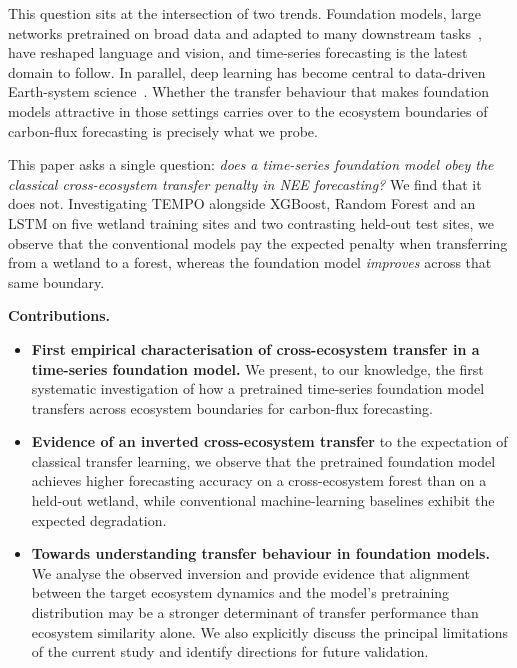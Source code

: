 \documentclass[sigconf]{acmart}          %
\begin{document}
This question sits at the intersection of two trends. Foundation models, large
networks pretrained on broad data and adapted to many downstream
tasks~\cite{bommasani2021foundation}, have reshaped language and vision, and
time-series forecasting is the latest domain to follow. In parallel, deep
learning has become central to data-driven Earth-system
science~\cite{reichstein2019deep}. Whether the transfer behaviour that makes
foundation models attractive in those settings carries over to the ecosystem
boundaries of carbon-flux forecasting is precisely what we probe.

This paper asks a single question: \emph{does a time-series foundation model
obey the classical cross-ecosystem transfer penalty in NEE forecasting?}
We find that it does not. Investigating TEMPO alongside XGBoost, Random Forest
and an LSTM on five wetland training sites and two contrasting held-out test
sites, we observe that the conventional models pay the expected penalty
when transferring from a wetland to a forest, whereas the foundation model
\emph{improves} across that same boundary.

\noindent\textbf{Contributions.}
\begin{itemize}
    \item \textbf{First empirical characterisation of cross-ecosystem transfer in a time-series foundation model.} We present, to our knowledge, the first systematic investigation of how a pretrained time-series foundation model transfers across ecosystem boundaries for carbon-flux forecasting.
    
    \item \textbf{Evidence of an inverted cross-\allowbreak ecosystem transfer} to the expectation of classical transfer learning, we observe that the pretrained foundation model achieves higher forecasting accuracy on a cross-ecosystem forest than on a held-out wetland, while conventional machine-learning baselines exhibit the expected degradation.
    
    \item \textbf{Towards understanding transfer behaviour in foundation models.} We analyse the observed inversion and provide evidence that alignment between the target ecosystem dynamics and the model's pretraining distribution may be a stronger determinant of transfer performance than ecosystem similarity alone. We also explicitly discuss the principal limitations of the current study and identify directions for future validation.
\end{itemize}
\end{document}
